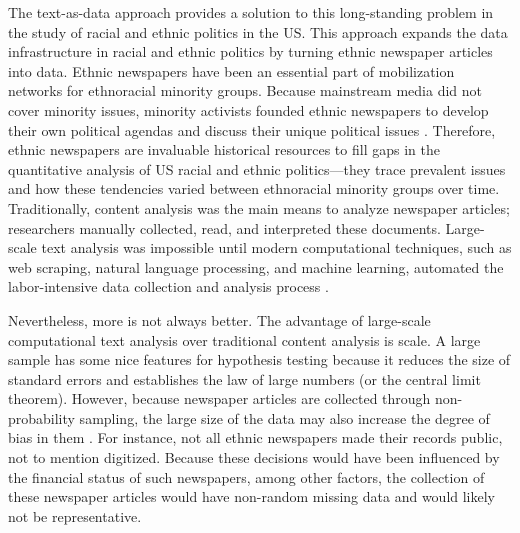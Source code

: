 \documentclass[12 pt]{article}
\begin{document}
The text-as-data approach provides a solution to this long-standing problem in the study of racial and ethnic politics in the US. This approach expands the data infrastructure in racial and ethnic politics by turning ethnic newspaper articles into data. Ethnic newspapers have been an essential part of mobilization networks for ethnoracial minority groups. Because mainstream media did not cover minority issues, minority activists founded ethnic newspapers to develop their own political agendas and discuss their unique political issues \citep{le1992asian, dawson1994black, rodriguez1999making, dawson2001black, kannegaard2008press, harris2010barbershops}. Therefore, ethnic newspapers are invaluable historical resources to fill gaps in the quantitative analysis of US racial and ethnic politics---they trace prevalent issues and how these tendencies varied between ethnoracial minority groups over time. Traditionally, content analysis was the main means to analyze newspaper articles; researchers manually collected, read, and interpreted these documents. Large-scale text analysis was impossible until modern computational techniques, such as web scraping, natural language processing, and machine learning, automated the labor-intensive data collection and analysis process \citep{grimmer2013text, wilkerson2017large}.

Nevertheless, more is not always better. The advantage of large-scale computational text analysis over traditional content analysis is scale. A large sample has some nice features for hypothesis testing because it reduces the size of standard errors and establishes the law of large numbers (or the central limit theorem). However, because newspaper articles are collected through non-probability sampling, the large size of the data may also increase the degree of bias in them \citep[685-688]{meng2018statistical}. For instance, not all ethnic newspapers made their records public, not to mention digitized. Because these decisions would have been influenced by the financial status of such newspapers, among other factors, the collection of these newspaper articles would have non-random missing data and would likely not be representative. 
\end{document}
